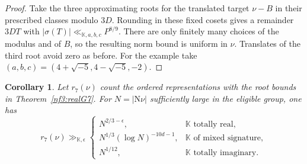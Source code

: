 \documentclass[11pt,letterpaper]{article}
\newtheorem{corollary}[corollary]{Corollary}
\theoremstyle{definition}
\numberwithin{equation}{section}
\begin{document}
\begin{proof}
Take the three approximating roots for the translated target
$\nu-B$ in their prescribed classes modulo $3D$. Rounding in these
fixed cosets gives a remainder $3DT$ with
$|\sigma(T)|\ll_{\mathbb K,a,b,c} P^{8/9}$. There are only finitely
many choices of the modulus and of $B$, so the resulting norm bound
is uniform in $\nu$. Translates of the third root avoid zero as
before. For the example take $(a,b,c)=(4+\sqrt{-5},4-\sqrt{-5},-2)$.
\end{proof}

\begin{corollary}\label{nf3:sevenmultiplicity}
Let $r_7(\nu)$ count the ordered representations with the root
bounds in Theorem~\ref{nf3:realG7}. For $N=|\mathrm N\nu|$
sufficiently large in the eligible group, one has
\[
r_7(\nu)\gg_{\mathbb K,\epsilon}
\begin{cases}
 N^{2/3-\epsilon},&\mathbb K\text{ totally real},\\
 N^{1/3}(\log N)^{-10d-1},&\mathbb K\text{ of mixed signature},\\
 N^{1/12},&\mathbb K\text{ totally imaginary}.
\end{cases}
\]
\end{corollary}
\end{document}
